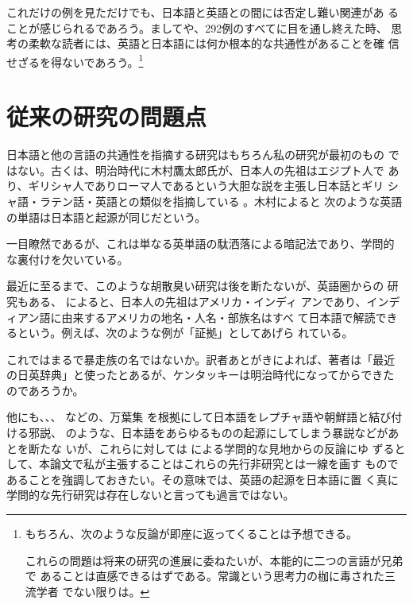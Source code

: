   これだけの例を見ただけでも、日本語と英語との間には否定し難い関連があ
ることが感じられるであろう。ましてや、292例のすべてに目を通し終えた時、
思考の柔軟な読者には、英語と日本語には何か根本的な共通性があることを確
信せざるを得ないであろう。\footnote{
もちろん、次のような反論が即座に返ってくることは予想できる。

\noindent
これらの問題は将来の研究の進展に委ねたいが、本能的に二つの言語が兄弟で
あることは直感できるはずである。常識という思考力の枷に毒された三流学者
でない限りは。
} %

\section{従来の研究の問題点}

  日本語と他の言語の共通性を指摘する研究はもちろん私の研究が最初のもの
ではない。古くは、明治時代に木村鷹太郎氏が、日本人の先祖はエジプト人で
あり、ギリシャ人でありローマ人であるという大胆な説を主張し日本話とギリ
シャ語・ラテン話・英語との類似を指摘している \cite{木村81}。木村によると
次のような英語の単語は日本語と起源が同じだという。

\noindent
一目瞭然であるが、これは単なる英単語の駄洒落による暗記法であり、学問的
な裏付けを欠いている。

  最近に至るまで、このような胡散臭い研究は後を断たないが、英語圏からの
研究もある、 によると、日本人の先祖はアメリカ・インディ
アンであり、インディアン語に由来するアメリカの地名・人名・部族名はすべ
て日本語で解読できるという。例えば、次のような例が「証拠」としてあげら
れている。

\noindent
これではまるで暴走族の名ではないか。訳者あとがきによれば、著者は「最近
の日英辞典」と使ったとあるが、ケンタッキーは明治時代になってからできた
のであろうか。

  他にも、、、 などの、万葉集
を根拠にして日本語をレプチャ語や朝鮮語と結び付ける邪説、 
のような、日本語をあらゆるものの起源にしてしまう暴説などがあとを断たな
いが、これらに対しては による学問的な見地からの反論にゆ
ずるとして、本論文で私が主張することはこれらの先行非研究とは一線を画す
ものであることを強調しておきたい。その意味では、英語の起源を日本語に置
く真に学問的な先行研究は存在しないと言っても過言ではない。

